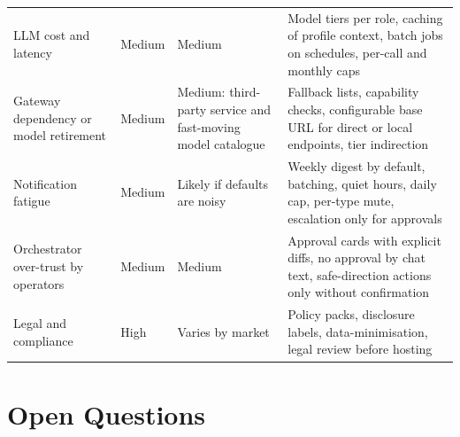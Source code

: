 \documentclass[11pt,a4paper]{article}
\begin{document}
\begin{longtable}{@{}p{3.6cm}p{1.6cm}p{4.4cm}p{5.7cm}@{}}
LLM cost and latency & Medium & Medium & Model tiers per role, caching of profile context, batch jobs on schedules, per-call and monthly caps\\
Gateway dependency or model retirement & Medium & Medium: third-party service and fast-moving model catalogue & Fallback lists, capability checks, configurable base URL for direct or local endpoints, tier indirection\\
Notification fatigue & Medium & Likely if defaults are noisy & Weekly digest by default, batching, quiet hours, daily cap, per-type mute, escalation only for approvals\\
Orchestrator over-trust by operators & Medium & Medium & Approval cards with explicit diffs, no approval by chat text, safe-direction actions only without confirmation\\
Legal and compliance & High & Varies by market & Policy packs, disclosure labels, data-minimisation, legal review before hosting\\
\bottomrule
\end{longtable}

\section{Open Questions}
\end{document}
